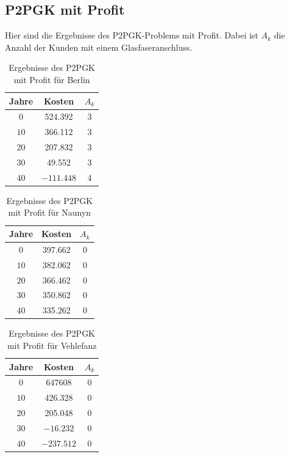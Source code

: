 \documentclass[11pt,a4paper]{article}
\theoremstyle{my_th_style1}
\begin{document}
\subsection*{P2PGK mit Profit}
Hier sind die Ergebnisse des P2PGK-Problems mit Profit. Dabei ist $A_k$ die Anzahl der Kunden mit einem Glasfaseranschluss.
\begin{table}[h]
	\centering
	\begin{tabular}{c|c|c}
		\centering
		Jahre & Kosten & $A_k$ \\	
		\hline
		$0$   	 &  524.392 & 3  \\
		$10$ 	&   366.112& 3  \\
		$20$   	&   207.832 & 3  \\
		$30$    &   49.552 & 3  \\
		$40$    & $-111.448$ & 4 \\
	\end{tabular}
	\label{P2PGKProfit}
	\caption{Ergebnisse des P2PGK mit Profit f\"ur Berlin} 
\end{table}

\begin{table}[h]
	\centering
	\begin{tabular}{c|c|c}
		\centering
		Jahre & Kosten & $A_k$ \\	
		\hline
		$0$   	 &  397.662& 0  \\
		$10$ 	&  382.062 & 0  \\
		$20$   	&  366.462  & 0  \\
		$30$    &  350.862 & 0  \\
		$40$    &  335.262  & 0 \\
	\end{tabular}
	\label{P2PGKProfitN}
	\caption{Ergebnisse des P2PGK mit Profit f\"ur Naunyn} 
\end{table}

\begin{table}[h]
	\centering
	\begin{tabular}{c|c|c}
		\centering
		Jahre & Kosten & $A_k$ \\	
		\hline
		$0$   	 & 647608  &0  \\
		$10$ 	&  426.328 & 0  \\
		$20$   	&  205.048  & 0  \\
		$30$    & $-16.232$& 0  \\
		$40$    &  $-237.512$ & 0 \\
	\end{tabular}
	\label{P2PGKProfitV}
	\caption{Ergebnisse des P2PGK mit Profit f\"ur Vehlefanz} 
\end{table}
\end{document}
